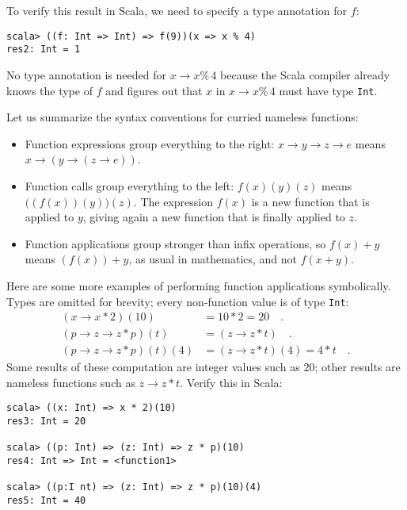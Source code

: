 To verify this result in Scala, we need to specify a type annotation
for $f$:
\begin{lstlisting}
scala> ((f: Int => Int) => f(9))(x => x % 4)
res2: Int = 1
\end{lstlisting}
No type annotation is needed for $x\rightarrow x\%\,4$ because the
Scala compiler already knows the type of $f$ and figures out that
$x$ in $x\rightarrow x\%\,4$ must have type \lstinline!Int!.

Let us summarize the syntax conventions for curried nameless functions:
\begin{itemize}
\item Function expressions group everything to the right: $x\rightarrow y\rightarrow z\rightarrow e$
means $x\rightarrow\left(y\rightarrow\left(z\rightarrow e\right)\right)$.
\item Function calls group everything to the left: $f(x)(y)(z)$ means $\big((f(x))(y)\big)(z)$.
The expression $f(x)$ is a new function that is applied to $y$,
giving again a new function that is finally applied to $z$.
\item Function applications group stronger than infix operations, so $f(x)+y$
means $(f(x))+y$, as usual in mathematics, and not $f(x+y)$.
\end{itemize}
Here are some more examples of performing function applications symbolically.
Types are omitted for brevity; every non-function value is of type
\texttt{}\lstinline!Int!:
\begin{align*}
\left(x\rightarrow x*2\right)(10) & =10*2=20\quad.\\
\left(p\rightarrow z\rightarrow z*p\right)\left(t\right) & =(z\rightarrow z*t)\quad.\\
\left(p\rightarrow z\rightarrow z*p\right)(t)(4) & =(z\rightarrow z*t)(4)=4*t\quad.
\end{align*}
Some results of these computation are integer values such as $20$;
other results are nameless functions such as $z\rightarrow z*t$.
Verify this in Scala:
\begin{lstlisting}
scala> ((x: Int) => x * 2)(10)
res3: Int = 20

scala> ((p: Int) => (z: Int) => z * p)(10)
res4: Int => Int = <function1>

scala> ((p:I nt) => (z: Int) => z * p)(10)(4)
res5: Int = 40 
\end{lstlisting}

